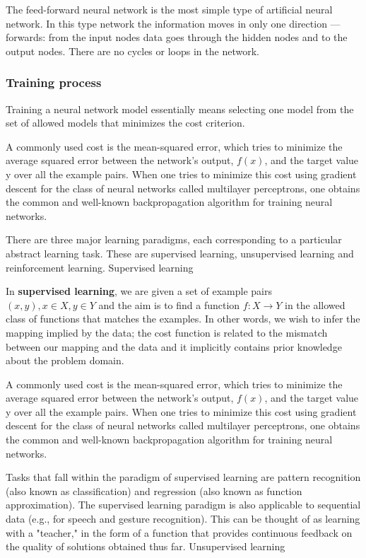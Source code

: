 \documentclass[a4paper,12pt]{article}
\begin{document}

The feed-forward neural network is the most simple type of artificial neural network. In this type network the information moves in only one direction — forwards: from the input nodes data goes through the hidden nodes and to the output nodes. There are no cycles or loops in the network.

\subsubsection{Training process}

Training a neural network model essentially means selecting one model from the set of allowed models that minimizes the cost criterion.

A commonly used cost is the mean-squared error, which tries to minimize the average squared error between the network's output, $f(x)$, and the target value y over all the example pairs. When one tries to minimize this cost using gradient descent for the class of neural networks called multilayer perceptrons, one obtains the common and well-known backpropagation algorithm for training neural networks.

There are three major learning paradigms, each corresponding to a particular abstract learning task. These are supervised learning, unsupervised learning and reinforcement learning.
Supervised learning

In \textbf{supervised learning}, we are given a set of example pairs $ (x, y), x \in X, y \in Y $ and the aim is to find a function $ f : X \rightarrow Y $ in the allowed class of functions that matches the examples. In other words, we wish to infer the mapping implied by the data; the cost function is related to the mismatch between our mapping and the data and it implicitly contains prior knowledge about the problem domain.

A commonly used cost is the mean-squared error, which tries to minimize the average squared error between the network's output, $f(x)$, and the target value y over all the example pairs. When one tries to minimize this cost using gradient descent for the class of neural networks called multilayer perceptrons, one obtains the common and well-known backpropagation algorithm for training neural networks.

Tasks that fall within the paradigm of supervised learning are pattern recognition (also known as classification) and regression (also known as function approximation). The supervised learning paradigm is also applicable to sequential data (e.g., for speech and gesture recognition). This can be thought of as learning with a "teacher," in the form of a function that provides continuous feedback on the quality of solutions obtained thus far.
Unsupervised learning
\end{document}
